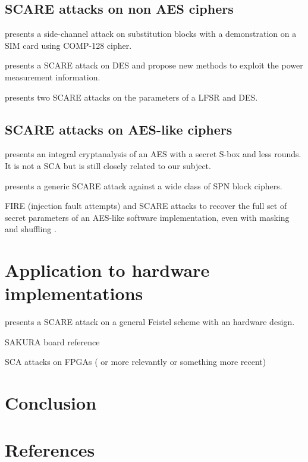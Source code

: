 \documentclass[11pt]{sdm}
\begin{document}
\subsection{SCARE attacks on non AES ciphers}

\cite{Novak_2003} presents a side-channel attack on substitution blocks with a demonstration on a SIM card using COMP-128 cipher.

\cite{Daudigny_Ledig_Muller_Valette_2005} presents a SCARE attack on DES and propose new methods to exploit the power measurement information.

\cite{Guilley_Sauvage_Micolod_Réal_Valette_2010} presents two SCARE attacks on the parameters of a LFSR and DES.

\subsection{SCARE attacks on AES-like ciphers}

\cite{Tiessen_Knudsen_Kölbl_Lauridsen_2015} presents an integral cryptanalysis of an AES with a secret S-box and less rounds. It is not a SCA but is still closely related to our subject.

\cite{Rivain_Roche_2013} presents a generic SCARE attack against a wide class of SPN block ciphers.

FIRE (injection fault attempts) and SCARE attacks to recover the full set of secret parameters of an AES-like software implementation, even with masking and shuffling \cite{Clavier_Isorez_Marion_Wurcker_2015}.

\section{Application to hardware implementations}

\cite{Réal_Dubois_Guilloux_Valette_Drissi_2008} presents a SCARE attack on a general Feistel scheme with an hardware design.

SAKURA board reference

SCA attacks on FPGAs (\cite{Peeters_Standaert_Donckers_Quisquater_2005} or more relevantly \cite{Standaert_Ors_Preneel_2004} or something more recent)

\section{Conclusion}

\section*{References}

\printbibliography
\end{document}

